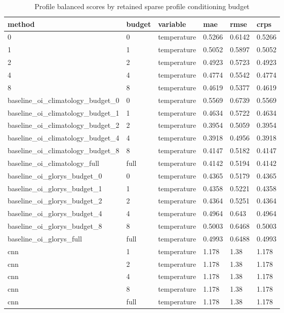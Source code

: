 \begin{table}[htbp]
\centering
\caption{Profile balanced scores by retained sparse profile conditioning budget}
\begin{tabular}{llllll}
\toprule
method & budget & variable & mae & rmse & crps \\
\midrule
0 & 0 & temperature & 0.5266 & 0.6142 & 0.5266 \\
1 & 1 & temperature & 0.5052 & 0.5897 & 0.5052 \\
2 & 2 & temperature & 0.4923 & 0.5723 & 0.4923 \\
4 & 4 & temperature & 0.4774 & 0.5542 & 0.4774 \\
8 & 8 & temperature & 0.4619 & 0.5377 & 0.4619 \\
baseline\_oi\_climatology\_budget\_0 & 0 & temperature & 0.5569 & 0.6739 & 0.5569 \\
baseline\_oi\_climatology\_budget\_1 & 1 & temperature & 0.4634 & 0.5722 & 0.4634 \\
baseline\_oi\_climatology\_budget\_2 & 2 & temperature & 0.3954 & 0.5059 & 0.3954 \\
baseline\_oi\_climatology\_budget\_4 & 4 & temperature & 0.3918 & 0.4956 & 0.3918 \\
baseline\_oi\_climatology\_budget\_8 & 8 & temperature & 0.4147 & 0.5182 & 0.4147 \\
baseline\_oi\_climatology\_full & full & temperature & 0.4142 & 0.5194 & 0.4142 \\
baseline\_oi\_glorys\_budget\_0 & 0 & temperature & 0.4365 & 0.5179 & 0.4365 \\
baseline\_oi\_glorys\_budget\_1 & 1 & temperature & 0.4358 & 0.5221 & 0.4358 \\
baseline\_oi\_glorys\_budget\_2 & 2 & temperature & 0.4364 & 0.5251 & 0.4364 \\
baseline\_oi\_glorys\_budget\_4 & 4 & temperature & 0.4964 & 0.643 & 0.4964 \\
baseline\_oi\_glorys\_budget\_8 & 8 & temperature & 0.5003 & 0.6468 & 0.5003 \\
baseline\_oi\_glorys\_full & full & temperature & 0.4993 & 0.6488 & 0.4993 \\
cnn & 1 & temperature & 1.178 & 1.38 & 1.178 \\
cnn & 2 & temperature & 1.178 & 1.38 & 1.178 \\
cnn & 4 & temperature & 1.178 & 1.38 & 1.178 \\
cnn & 8 & temperature & 1.178 & 1.38 & 1.178 \\
cnn & full & temperature & 1.178 & 1.38 & 1.178 \\

\end{tabular}
\end{table}
